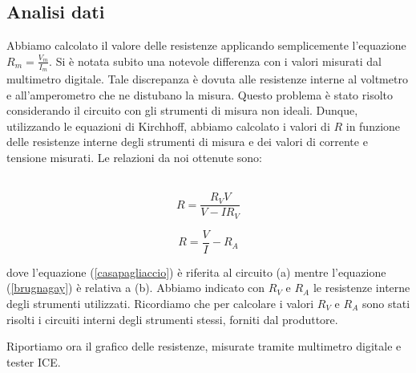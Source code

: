 \subsection{Analisi dati}

Abbiamo calcolato il valore delle resistenze applicando semplicemente l'equazione $R_m=\frac{V_m}{I_m}$. Si è notata subito una notevole differenza con i valori misurati dal multimetro digitale. Tale discrepanza è dovuta alle resistenze interne al voltmetro e all'amperometro che ne distubano la misura. Questo problema è stato risolto considerando il circuito con gli strumenti di misura non ideali. Dunque, utilizzando le equazioni di Kirchhoff, abbiamo calcolato i valori di $R$ in funzione delle resistenze interne degli strumenti di misura e dei valori di corrente e tensione misurati. Le relazioni da noi ottenute sono:\\
\\
\noindent\begin{minipage}{.5\linewidth}
\begin{equation}
R=\frac{R_VV}{V-IR_V}
\label{casapagliaccio}
\end{equation}
\end{minipage}%
\begin{minipage}{.5\linewidth}
\begin{equation}
R=\frac{V}{I}-R_A
\label{brugnagay}
\end{equation}
\end{minipage}
\break
dove l'equazione (\ref{casapagliaccio}) è riferita al circuito (a) mentre l'equazione (\ref{brugnagay}) è relativa a (b). Abbiamo indicato con $R_V$ e $R_A$ le resistenze interne degli strumenti utilizzati. 
Ricordiamo che per calcolare i valori $R_V$ e $R_A$ sono stati risolti i circuiti interni degli strumenti stessi, forniti dal produttore. 

Riportiamo ora il grafico delle resistenze, misurate tramite multimetro digitale e tester ICE. 

